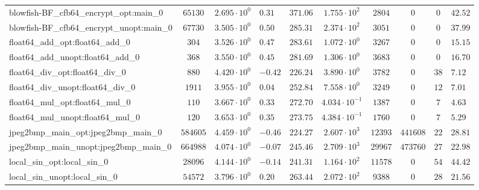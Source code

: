 \begin{tabular}{|l|c|HHc|c|c|c|cH|}
blowfish-BF\_cfb64\_encrypt\_opt:main\_0        & $ 65130    $ & $ 2.695 \cdot 10^{0} $ & $ 0.31  $ & $ 371.06 $ & $ 1.755 \cdot 10^{2}  $ & $ 2804   $ & $ 0       $ & $ 0   $ & $ 42.52   $ \\
blowfish-BF\_cfb64\_encrypt\_unopt:main\_0      & $ 67730    $ & $ 3.505 \cdot 10^{0} $ & $ 0.50  $ & $ 285.31 $ & $ 2.374 \cdot 10^{2}  $ & $ 3051   $ & $ 0       $ & $ 0   $ & $ 37.99   $ \\
float64\_add\_opt:float64\_add\_0               & $ 304      $ & $ 3.526 \cdot 10^{0} $ & $ 0.47  $ & $ 283.61 $ & $ 1.072 \cdot 10^{0}  $ & $ 3267   $ & $ 0       $ & $ 0   $ & $ 15.15   $ \\
float64\_add\_unopt:float64\_add\_0             & $ 368      $ & $ 3.550 \cdot 10^{0} $ & $ 0.45  $ & $ 281.69 $ & $ 1.306 \cdot 10^{0}  $ & $ 3683   $ & $ 0       $ & $ 0   $ & $ 16.70   $ \\
float64\_div\_opt:float64\_div\_0               & $ 880      $ & $ 4.420 \cdot 10^{0} $ & $ -0.42 $ & $ 226.24 $ & $ 3.890 \cdot 10^{0}  $ & $ 3782   $ & $ 0       $ & $ 38  $ & $ 7.12    $ \\
float64\_div\_unopt:float64\_div\_0             & $ 1911     $ & $ 3.955 \cdot 10^{0} $ & $ 0.04  $ & $ 252.84 $ & $ 7.558 \cdot 10^{0}  $ & $ 3249   $ & $ 0       $ & $ 12  $ & $ 7.01    $ \\
float64\_mul\_opt:float64\_mul\_0               & $ 110      $ & $ 3.667 \cdot 10^{0} $ & $ 0.33  $ & $ 272.70 $ & $ 4.034 \cdot 10^{-1} $ & $ 1387   $ & $ 0       $ & $ 7   $ & $ 4.63    $ \\
float64\_mul\_unopt:float64\_mul\_0             & $ 120      $ & $ 3.653 \cdot 10^{0} $ & $ 0.35  $ & $ 273.75 $ & $ 4.384 \cdot 10^{-1} $ & $ 1760   $ & $ 0       $ & $ 7   $ & $ 5.29    $ \\
jpeg2bmp\_main\_opt:jpeg2bmp\_main\_0           & $ 584605   $ & $ 4.459 \cdot 10^{0} $ & $ -0.46 $ & $ 224.27 $ & $ 2.607 \cdot 10^{3}  $ & $ 12393  $ & $ 441608  $ & $ 22  $ & $ 28.81   $ \\
jpeg2bmp\_main\_unopt:jpeg2bmp\_main\_0         & $ 664988   $ & $ 4.074 \cdot 10^{0} $ & $ -0.07 $ & $ 245.46 $ & $ 2.709 \cdot 10^{3}  $ & $ 29967  $ & $ 473760  $ & $ 27  $ & $ 22.98   $ \\
local\_sin\_opt:local\_sin\_0                   & $ 28096    $ & $ 4.144 \cdot 10^{0} $ & $ -0.14 $ & $ 241.31 $ & $ 1.164 \cdot 10^{2}  $ & $ 11578  $ & $ 0       $ & $ 54  $ & $ 44.42   $ \\
local\_sin\_unopt:local\_sin\_0                 & $ 54572    $ & $ 3.796 \cdot 10^{0} $ & $ 0.20  $ & $ 263.44 $ & $ 2.072 \cdot 10^{2}  $ & $ 9388   $ & $ 0       $ & $ 28  $ & $ 21.56   $ \\

\end{tabular}

